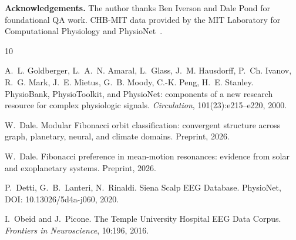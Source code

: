 \documentclass[11pt]{article}
\begin{document}
\bigskip
\noindent\textbf{Acknowledgements.}
The author thanks Ben Iverson and Dale Pond for foundational QA work.
CHB-MIT data provided by the MIT Laboratory for Computational Physiology
and PhysioNet~\cite{chbmit}.

\begin{thebibliography}{10}

A.~L. Goldberger, L.~A.~N. Amaral, L.~Glass, J.~M. Hausdorff, P.~Ch. Ivanov,
R.~G. Mark, J.~E. Mietus, G.~B. Moody, C.-K. Peng, H.~E. Stanley.
\newblock PhysioBank, PhysioToolkit, and PhysioNet: components of a new research resource for complex physiologic signals.
\newblock \emph{Circulation}, 101(23):e215--e220, 2000.

W.~Dale.
\newblock Modular Fibonacci orbit classification: convergent structure across graph, planetary, neural, and climate domains.
\newblock Preprint, 2026.

W.~Dale.
\newblock Fibonacci preference in mean-motion resonances: evidence from solar and exoplanetary systems.
\newblock Preprint, 2026.

P.~Detti, G.~B.~Lanteri, N.~Rinaldi.
\newblock Siena Scalp EEG Database.
\newblock PhysioNet, DOI: 10.13026/5d4a-j060, 2020.

I.~Obeid and J.~Picone.
\newblock The Temple University Hospital EEG Data Corpus.
\newblock \emph{Frontiers in Neuroscience}, 10:196, 2016.

\end{thebibliography}
\end{document}
